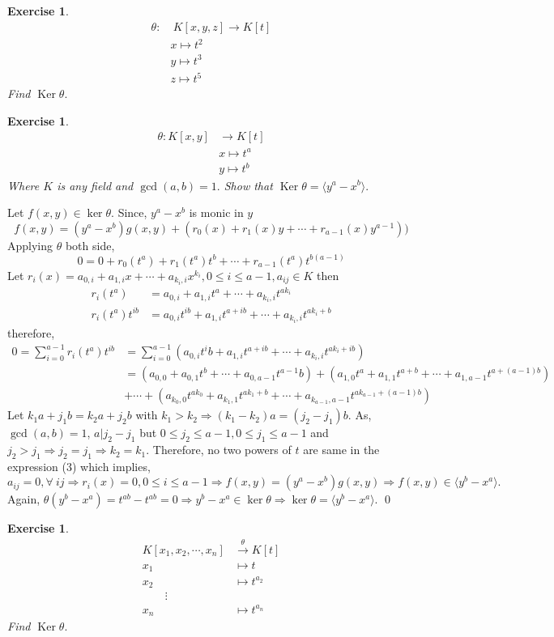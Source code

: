 \documentclass[11pt]{amsart}
\newtheorem{ex}[theorem]{Exercise}
\newcommand{\gen}[1]{\langle#1\rangle}
\begin{document}
\begin{ex}
\begin{align*}
\theta:&~K[x,y,z]\to K[t]\\
&x\mapsto t^2\\
&y\mapsto t^3\\
&z\mapsto t^5
\end{align*}
Find $\operatorname{Ker}\theta.$
\end{ex}
\begin{ex}
\begin{align*}
\theta:K[x,y]&\to K[t]\\
&x\mapsto t^a\\
&y\mapsto t^b
\end{align*}
Where $K$ is any field and $\gcd (a,b)=1.$ Show that $\operatorname{Ker}\theta=\langle y^a-x^b\rangle.$
\end{ex}
\proof Let $f(x,y)\in \ker \theta.$ Since, $y^a-x^b$ is monic in $y$ $$f(x,y)=(y^a-x^b)g(x,y)+(r_0(x)+r_1(x)y+\cdots +r_{a-1}(x)y^{a-1}))$$ Applying $\theta$ both side, $$0=0+r_0(t^a)+r_1(t^a)t^b+\cdots +r_{a-1}(t^a)t^{b(a-1)}$$
Let $r_i(x)=a_{0,i}+a_{1,i}x+\cdots +a_{k_i,i}x^{k_i},0\leq i\leq a-1,a_{ij}\in K$
then \begin{align*}
r_i(t^a)&=a_{0,i}+a_{1,i}t^a+\cdots +a_{k_i,i}t^{ak_i}\\
r_i(t^a)t^{ib}&=a_{0,i}t^{ib}+a_{1,i}t^{a+ib}+\cdots +a_{k_i,i}t^{ak_i+b}
\end{align*}
therefore, \begin{align}
0=\displaystyle\sum_{i=0}^{a-1} r_i(t^a)t^{ib}&=\displaystyle\sum_{i=0}^{a-1} (a_{0,i}t^ib+a_{1,i}t^{a+ib}+\cdots +a_{k_i,i}t^{ak_i+ib}) \nonumber\\
&=(a_{0,0}+a_{0,1}t^b+\cdots +a_{0,a-1}t^{a-1}b)+(a_{1,0}t^a+a_{1,1}t^{a+b}+\cdots +a_{1,a-1}t^{a+(a-1)b}) \nonumber\\
&+\cdots +(a_{k_0,0}t^{ak_0}+a_{k_1,1}t^{ak_1+b}+\cdots +a_{k_{a-1},a-1}t^{ak_{a-1}+(a-1)b})
\end{align}
Let $k_1a+j_1b=k_2a+j_2b$ with $k_1>k_2 \Rightarrow (k_1-k_2)a=(j_2-j_1)b.$ As, $\gcd (a,b)=1$, $a|j_2-j_1$ but $0\leq j_2\leq a-1,0\leq j_1\leq a-1$ and $j_2>j_1 \Rightarrow j_2=j_1 \Rightarrow k_2=k_1$. Therefore, no two powers of $t$ are same in the expression (3) which implies, $a_{ij}=0,\forall~ij \Rightarrow r_i(x)=0,0\leq i\leq a-1 \Rightarrow f(x,y)=(y^a-x^b)g(x,y) \Rightarrow f(x,y) \in \gen{y^b-x^a}.$ Again, $\theta(y^b-x^a)=t^{ab}-t^{ab}=0 \Rightarrow y^b-x^a \in \ker \theta \Rightarrow \ker \theta =\gen{y^b-x^a}.$ \qed
\begin{ex}
\begin{align*}
K[x_1,x_2,\cdots ,x_n]&\stackrel{\theta}{\longrightarrow} K[t]\\
x_1&\mapsto t\\
x_2&\mapsto t^{a_2}\\
\qquad \vdots\\
x_n&\mapsto t^{a_n}
\end{align*}
Find $\operatorname{Ker}\theta.$
\end{ex}
\end{document}
